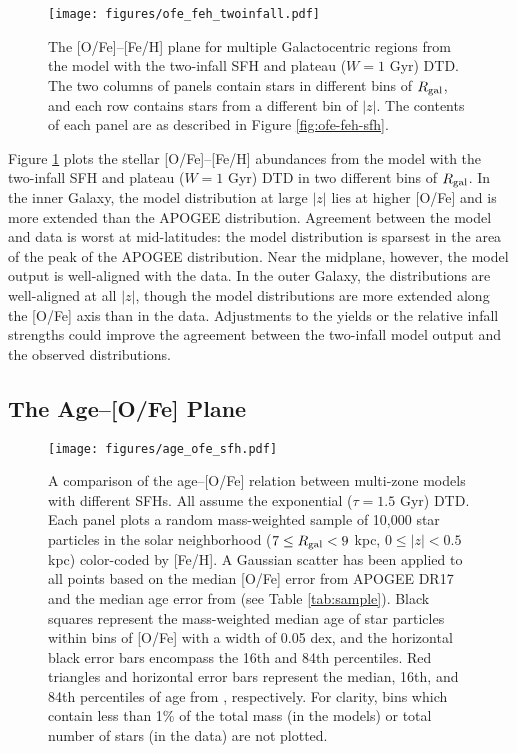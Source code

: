 \documentclass[twocolumn,twocolappendix]{aastex631}
\begin{document}
\begin{figure}
    \centering
    \texttt{[image: figures/ofe\_feh\_twoinfall.pdf]}
    \caption{The [O/Fe]--[Fe/H] plane for multiple Galactocentric regions from the model with the two-infall SFH and plateau ($W=1$ Gyr) DTD. The two columns of panels contain stars in different bins of $R_{\rm gal}$, and each row contains stars from a different bin of $|z|$. The contents of each panel are as described in Figure \ref{fig:ofe-feh-sfh}.}
    \label{fig:ofe-feh-twoinfall}
\end{figure}

Figure \ref{fig:ofe-feh-twoinfall} plots the stellar [O/Fe]--[Fe/H] abundances from the model with the two-infall SFH and plateau ($W=1$ Gyr) DTD in two different bins of $R_{\rm gal}$. In the inner Galaxy, the model distribution at large $|z|$ lies at higher [O/Fe] and is more extended than the APOGEE distribution. Agreement between the model and data is worst at mid-latitudes: the model distribution is sparsest in the area of the peak of the APOGEE distribution. Near the midplane, however, the model output is well-aligned with the data. In the outer Galaxy, the distributions are well-aligned at all $|z|$, though the model distributions are more extended along the [O/Fe] axis than in the data. Adjustments to the yields or the relative infall strengths could improve the agreement between the two-infall model output and the observed distributions.

\subsection{The Age--[O/Fe] Plane}
\label{sec:age-ofe}

\begin{figure}
    \centering
    \texttt{[image: figures/age\_ofe\_sfh.pdf]}
    \caption{A comparison of the age--[O/Fe] relation between multi-zone models with different SFHs. All assume the exponential ($\tau=1.5$ Gyr) DTD. Each panel plots a random mass-weighted sample of 10,000 star particles in the solar neighborhood ($7\leq R_{\rm gal}<9$ kpc, $0\leq|z|<0.5$ kpc) color-coded by [Fe/H]. A Gaussian scatter has been applied to all points based on the median [O/Fe] error from APOGEE DR17 and the median age error from  (see Table \ref{tab:sample}). Black squares represent the mass-weighted median age of star particles within bins of [O/Fe] with a width of 0.05 dex, and the horizontal black error bars encompass the 16th and 84th percentiles. Red triangles and horizontal error bars represent the median, 16th, and 84th percentiles of age from , respectively. For clarity, bins which contain less than 1\% of the total mass (in the models) or total number of stars (in the data) are not plotted.}
    \label{fig:age-ofe-sfh}
\end{figure}
\end{document}
